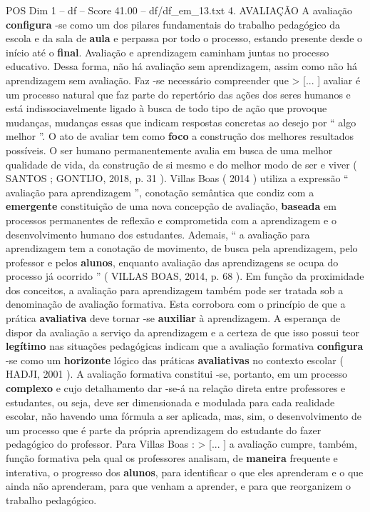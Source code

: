\begin{textsample}{POS Dim 1 – df – Score 41.00 – df/df\_em\_13.txt}  \label{ex:f1_pos_128}
4.
AVALIAÇÃO A avaliação \textbf{configura} -se como um dos pilares fundamentais do trabalho pedagógico da escola e da sala de \textbf{aula} e perpassa por todo o processo, estando presente desde o início até o \textbf{final}.
Avaliação e aprendizagem caminham juntas no processo educativo.
Dessa forma, não há avaliação sem aprendizagem, assim como não há aprendizagem sem avaliação.
Faz -se necessário compreender que > [... ] avaliar é um processo natural que faz parte do repertório das ações dos seres humanos e está indissociavelmente ligado à busca de todo tipo de ação que provoque mudanças, mudanças essas que indicam respostas concretas ao desejo por “ algo melhor ”.
O ato de avaliar tem como \textbf{foco} a construção dos melhores resultados possíveis.
O ser humano permanentemente avalia em busca de uma melhor qualidade de vida, da construção de si mesmo e do melhor modo de ser e viver ( SANTOS ; GONTIJO, 2018, p. 31 ).
Villas Boas ( 2014 ) utiliza a expressão “ avaliação para aprendizagem ”, conotação semântica que condiz com a \textbf{emergente} constituição de uma nova concepção de avaliação, \textbf{baseada} em processos permanentes de reflexão e comprometida com a aprendizagem e o desenvolvimento humano dos estudantes.
Ademais, “ a avaliação para aprendizagem tem a conotação de movimento, de busca pela aprendizagem, pelo professor e pelos \textbf{alunos}, enquanto avaliação das aprendizagens se ocupa do processo já ocorrido ” ( VILLAS BOAS, 2014, p. 68 ).
Em função da proximidade dos conceitos, a avaliação para aprendizagem também pode ser tratada sob a denominação de avaliação formativa.
Esta corrobora com o princípio de que a prática \textbf{avaliativa} deve tornar -se \textbf{auxiliar} à aprendizagem.
A esperança de dispor da avaliação a serviço da aprendizagem e a certeza de que isso possui teor \textbf{legítimo} nas situações pedagógicas indicam que a avaliação formativa \textbf{configura} -se como um \textbf{horizonte} lógico das práticas \textbf{avaliativas} no contexto escolar ( HADJI, 2001 ).
A avaliação formativa constitui -se, portanto, em um processo \textbf{complexo} e cujo detalhamento dar -se-á na relação direta entre professores e estudantes, ou seja, deve ser dimensionada e modulada para cada realidade escolar, não havendo uma fórmula a ser aplicada, mas, sim, o desenvolvimento de um processo que é parte da própria aprendizagem do estudante do fazer pedagógico do professor.
Para Villas Boas : > [... ] a avaliação cumpre, também, função formativa pela qual os professores analisam, de \textbf{maneira} frequente e interativa, o progresso dos \textbf{alunos}, para identificar o que eles aprenderam e o que ainda não aprenderam, para que venham a aprender, e para que reorganizem o trabalho pedagógico.

\end{textsample}
